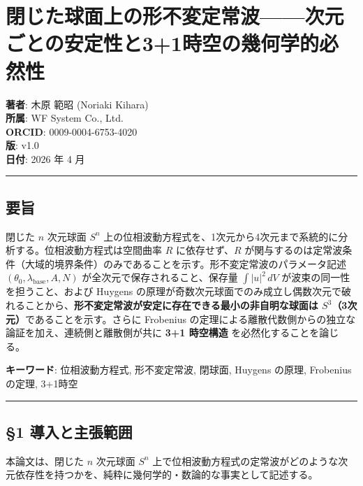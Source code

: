 \documentclass[
  a4paper,11pt]{ltjsarticle}
\theoremstyle{definition}
\theoremstyle{remark}
\begin{document}
\section{閉じた球面上の形不変定常波------次元ごとの安定性と3+1時空の幾何学的必然性}\label{ux9589ux3058ux305fux7403ux9762ux4e0aux306eux5f62ux4e0dux5909ux5b9aux5e38ux6ce2ux6b21ux5143ux3054ux3068ux306eux5b89ux5b9aux6027ux306831ux6642ux7a7aux306eux5e7eux4f55ux5b66ux7684ux5fc5ux7136ux6027}

\textbf{著者}: 木原 範昭 (Noriaki Kihara)\\
\textbf{所属}: WF System Co., Ltd.\\
\textbf{ORCID}: 0009-0004-6753-4020\\
\textbf{版}: v1.0\\
\textbf{日付}: 2026 年 4 月

\begin{center}\rule{0.5\linewidth}{0.5pt}\end{center}

\subsection{要旨}\label{ux8981ux65e8}

閉じた \(n\) 次元球面 \(S^n\)
上の位相波動方程式を、1次元から4次元まで系統的に分析する。位相波動方程式は空間曲率
\(R\) に依存せず、\(R\)
が関与するのは定常波条件（大域的境界条件）のみであることを示す。形不変定常波のパラメータ記述
\((\theta_0, \lambda_{\text{base}}, A, N)\)
が全次元で保存されること、保存量 \(\int |u|^2 \, dV\)
が波束の同一性を担うこと、および Huygens
の原理が奇数次元球面でのみ成立し偶数次元で破れることから、\textbf{形不変定常波が安定に存在できる最小の非自明な球面は
\(S^3\)（3次元）}であることを示す。さらに Frobenius
の定理による離散代数側からの独立な論証を加え、連続側と離散側が共に
\textbf{3+1 時空構造} を必然化することを論じる。

\textbf{キーワード}: 位相波動方程式, 形不変定常波, 閉球面, Huygens
の原理, Frobenius の定理, 3+1時空

\begin{center}\rule{0.5\linewidth}{0.5pt}\end{center}

\subsection{§1
導入と主張範囲}\label{ux5c0eux5165ux3068ux4e3bux5f35ux7bc4ux56f2}

本論文は、閉じた \(n\) 次元球面 \(S^n\)
上で位相波動方程式の定常波がどのような次元依存性を持つかを、純粋に幾何学的・数論的な事実として記述する。
\end{document}
